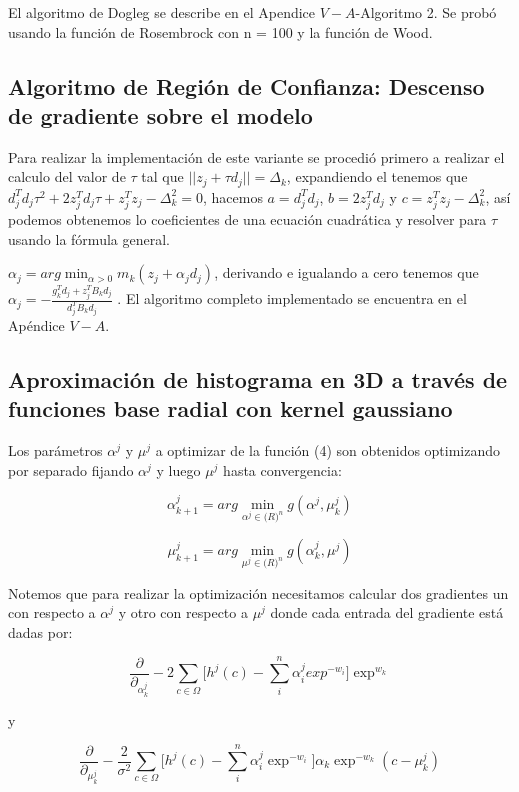 \documentclass[conference]{IEEEtran}
\begin{document}
El algoritmo de Dogleg se describe en el Apendice $V-A$-Algoritmo 2. Se probó usando la función de
Rosembrock con n = 100 y la función de Wood.

\subsection{Algoritmo de Región de Confianza: Descenso de gradiente sobre el modelo}

Para realizar la implementación de este variante se procedió primero a realizar el calculo del valor
de $\tau$ tal que $|| z_j + \tau d_j || = \Delta_k$, expandiendo el tenemos que
$d_j^T d_j \tau^2 + 2 z_j^T d_j \tau + z_j^T z_j - \Delta_k^2 = 0$, hacemos $a = d_j^T d_j$,
$b = 2 z_j^T d_j$ y $c = z_j^T z_j - \Delta_k^2$, así podemos obtenemos lo coeficientes de una
ecuación cuadrática y resolver para $\tau$ usando la fórmula general.

$\alpha_j = arg \min_{\alpha > 0} m_k(z_j + \alpha_j d_j)$, derivando e igualando a cero tenemos que
$\alpha_j = - \frac{g_k^T d_j + z_j^T B_k d_j}{d_j^T B_k d_j}$ . El algoritmo completo implementado
se encuentra en el Apéndice $V-A$.

\subsection{Aproximación de histograma en 3D a través de funciones base radial con kernel gaussiano}

Los parámetros $\alpha^j$ y $\mu^j$ a optimizar de la función (4) son obtenidos optimizando por
separado fijando $\alpha^j$ y luego $\mu^j$ hasta convergencia:

$$
	\alpha^j_{k+1} = arg \min_{\alpha^j \in \mathcal(R)^n} g(\alpha^j, \mu^j_k)
$$

$$
	\mu^j_{k+1} = arg \min_{\mu^j \in \mathcal(R)^n} g(\alpha^j_k, \mu^j)
$$

Notemos que para realizar la optimización necesitamos calcular dos gradientes un con respecto a
$\alpha^j$ y otro con respecto a $\mu^j$ donde cada entrada del gradiente está dadas por:

$$
	\frac{\partial}{\partial_{\alpha_k^j}}
	-2 \sum_{c \in \Omega} \Big[ h^j(c)
	- \sum_i^n \alpha_i^j exp^{-w_i}
	\Big] \exp^{w_k}
$$

y

$$
	\frac{\partial}{\partial_{\mu_k^j}}
	- \frac{2}{\sigma^2} \sum_{c \in \Omega} \Big[ h^j(c)
	- \sum_i^n \alpha_i^j \exp^{-w_i}
	\Big] \alpha_k \exp^{-w_k}(c - \mu_k^j)
$$
\end{document}
